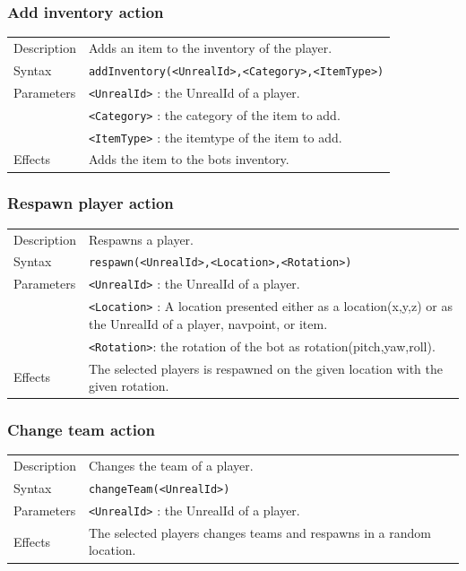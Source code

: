 \documentclass[11pt,a4paper]{article}
\begin{document}
\subsubsection*{Add inventory action}

\begin{small}
\begin{tabular}{p{2cm}p{9cm}}
Description & Adds an item to the inventory of the player. \\
Syntax & \verb|addInventory(<UnrealId>,<Category>,<ItemType>)|\\
Parameters 	& \verb|<UnrealId>| : the UnrealId of a player. \\
		& \verb|<Category>| : the category of the item to add. \\
		& \verb|<ItemType>| : the itemtype of the item to add. \\
Effects &	Adds the item to the bots inventory.\\
\end{tabular}
\end{small}

\subsubsection*{Respawn player  action}

\begin{small}
\begin{tabular}{p{2cm}p{9cm}}
Description & Respawns a player. \\
Syntax & \verb|respawn(<UnrealId>,<Location>,<Rotation>)|\\
Parameters 	& \verb|<UnrealId>| : the UnrealId of a player. \\
		& \verb|<Location>| : A location presented either as a location(x,y,z) or as the UnrealId of a player, navpoint, or item. \\
		& \verb|<Rotation>|: the rotation of the bot as rotation(pitch,yaw,roll).\\
Effects &	The selected players is respawned on the given location with the given rotation. \\
\end{tabular}
\end{small}

\subsubsection*{Change team action}

\begin{small}
\begin{tabular}{p{2cm}p{9cm}}
Description & Changes the team of a player. \\
Syntax & \verb|changeTeam(<UnrealId>)|\\
Parameters 	& \verb|<UnrealId>| : the UnrealId of a player. \\
Effects &	The selected players changes teams and respawns in a random location. \\
\end{tabular}
\end{small}
\end{document}
